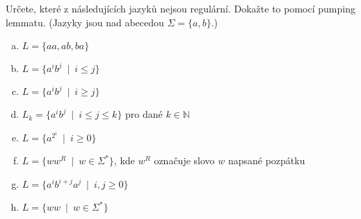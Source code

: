 \documentclass[a4paper,12pt]{amsart}
\begin{document}
\medskip\begin{problem}

    Určete, které z následujících jazyků nejsou regulární. Dokažte to pomocí pumping lemmatu. (Jazyky jsou nad abecedou $\Sigma=\{a,b\}$.)

    \medskip
  
    \begin{enumerate}[(a)]\setlength\itemsep{12pt}
        \item $L=\{aa, ab, ba\}$
        \item $L=\{a^ib^j\ \mid\ i\leq j\}$
        \item $L=\{a^ib^j\ \mid\ i\geq j\}$
        \item $L_k=\{a^ib^j\ \mid\ i\leq j\leq k\}$ pro dané $k\in\mathbb N$
        \item $L=\{a^{2^i}\ \mid\ i\geq 0\}$
        \item $L=\{ww^R\ \mid \ w\in\Sigma^*\}$, kde $w^R$ označuje slovo $w$ napsané pozpátku
        \item $L=\{a^ib^{i+j}a^j\ \mid\ i,j\geq 0\}$
        \item $L=\{ww\ \mid \ w\in\Sigma^*\}$
        
    \end{enumerate}
  
\end{problem}
\end{document}
